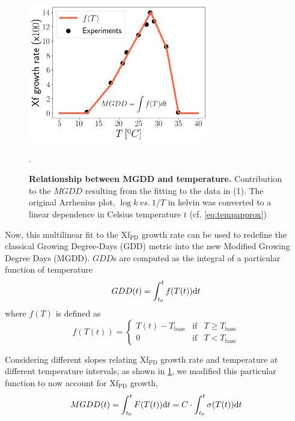 \begin{figure}[H]
    \centering
    \includegraphics[width=0.7\textwidth]{Figures/Climatic_layer_1.png}
    \caption[Relationship between MGDD and temperature]{\textbf{Relationship
            between MGDD and temperature.}
        Contribution to the $MGDD$ resulting from the fitting to the data in
        (1). The
        original Arrhenius plot, $\log{k} \ vs. \ 1/T$ in kelvin was converted
        to
        a linear dependence in Celsius temperature $t$ (cf.
        \cref{eq:tempapprox})}.
    \label{figS2} %
\end{figure}

Now, this multilinear fit to the Xf$_{\textrm{PD}}$ growth rate can be
used to redefine the classical Growing Degree-Days (GDD) metric into the new
Modified Growing Degree Days (MGDD). $GDD$s are computed as the integral of a
particular function of temperature
\begin{equation}
    GDD(t)=\int_{t_0}^tf(T(t))\mathrm{d} t
\end{equation}
where $f(T)$ is defined as
\begin{equation}
    f(T(t))=\left\{\begin{array}{ccc}
        T(t) - T_{\textrm{base}} & \textrm{if} & T\geq T_{\textrm{base}} \\
        0                        & \textrm{if} & T < T_{\textrm{base}}
    \end{array} \right.
\end{equation}

Considering different slopes relating Xf$_{\textrm{PD}}$ growth rate and
temperature at different temperature intervals, as shown in \cref{figS2}, we
modified this particular function to now account for Xf$_{\textrm{PD}}$ growth,
\begin{equation}\label{eq:MGDD_t}
    MGDD(t)=\int_{t_0}^tF(T(t))\mathrm{d} t=C\cdot\int_{t_0}^t\sigma(T(t))\mathrm{d} t
\end{equation}

